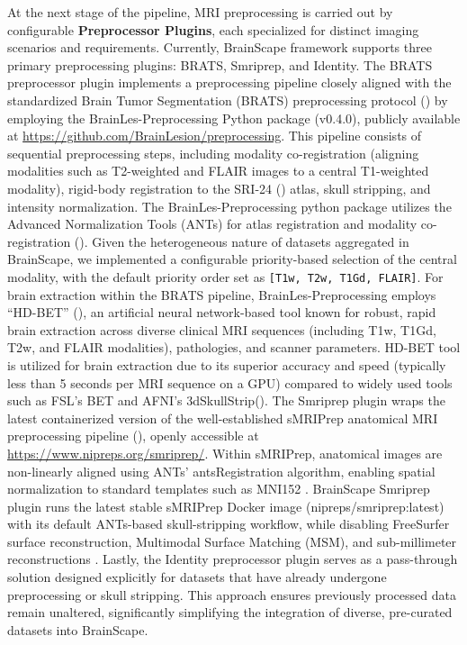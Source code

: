 At the next stage of the pipeline, MRI preprocessing is carried out by configurable \textbf{Preprocessor Plugins}, 
each specialized for distinct imaging scenarios and requirements.
Currently, BrainScape framework supports three primary preprocessing plugins: BRATS, Smriprep, and Identity. 
The BRATS preprocessor plugin implements a preprocessing pipeline closely aligned with the standardized 
Brain Tumor Segmentation (BRATS) preprocessing protocol (\cite{menze2014multimodal}) by 
employing the BrainLes-Preprocessing Python package (v0.4.0), publicly available at \url{https://github.com/BrainLesion/preprocessing}. 
This pipeline consists of sequential preprocessing steps, including modality co-registration 
(aligning modalities such as T2-weighted and FLAIR images to a central T1-weighted modality), 
rigid-body registration to the SRI-24 (\cite{rohlfing2010sri24}) atlas, skull stripping, and intensity normalization. 
The BrainLes-Preprocessing python package utilizes the Advanced Normalization Tools (ANTs) 
for atlas registration and modality co-registration (\cite{tustison2021antsx}). 
Given the heterogeneous nature of datasets aggregated in BrainScape, 
we implemented a configurable priority-based selection of the central modality, 
with the default priority order set as \texttt{[T1w, T2w, T1Gd, FLAIR]}. 
For brain extraction within the BRATS pipeline, BrainLes-Preprocessing employs ``HD-BET'' (\cite{isensee2019automated}), 
an artificial neural network-based tool known for robust, rapid brain extraction across diverse 
clinical MRI sequences (including T1w, T1Gd, T2w, and FLAIR modalities), pathologies, and scanner parameters. 
HD-BET tool is utilized for brain extraction due to 
its superior accuracy and speed (typically less than 5 seconds per MRI sequence on a GPU) 
compared to widely used tools such as FSL's BET and AFNI's 3dSkullStrip(\cite{isensee2019automated, smith2000bet}).
The Smriprep plugin wraps the latest containerized version of the well-established sMRIPrep anatomical MRI preprocessing pipeline (\cite{esteban2021smriprep}), 
openly accessible at \url{https://www.nipreps.org/smriprep/}. 
Within sMRIPrep, anatomical images are non-linearly aligned using ANTs' antsRegistration algorithm, 
enabling spatial normalization to standard templates such as MNI152 \cite{avants2008symmetric,avants2011reproducible}.
BrainScape Smriprep plugin runs the latest stable sMRIPrep Docker image (nipreps/smriprep:latest) with its default ANTs-based skull-stripping workflow, 
while disabling FreeSurfer surface reconstruction, Multimodal Surface Matching (MSM), and sub-millimeter reconstructions 
\cite{esteban2021smriprep}.
Lastly, the Identity preprocessor plugin serves as a pass-through solution designed explicitly for datasets that 
have already undergone preprocessing or skull stripping. 
This approach ensures previously processed data remain unaltered, significantly simplifying the integration of diverse, 
pre-curated datasets into BrainScape.

